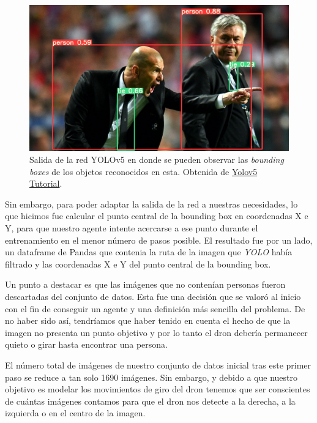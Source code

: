 \begin{figure}[ht!]
    \centering
    \includegraphics[width=1\linewidth]{figuras/yolov5_output_example.jpeg}
    \caption[Visualización de la salida de la red YOLO]{Salida de la red YOLOv5 en donde se pueden observar las \textit{bounding boxes} de los objetos reconocidos en esta. Obtenida de \href{https://colab.research.google.com/github/ultralytics/yolov5/blob/master/tutorial.ipynb}{Yolov5 Tutorial}.}
    \label{fig-yolov5-output-example}
\end{figure}

Sin embargo, para poder adaptar la salida de la red a nuestras necesidades, lo que hicimos fue calcular el punto central de la bounding box en coordenadas X e Y, para que nuestro agente intente acercarse a ese punto durante el entrenamiento en el menor número de pasos posible.
El resultado fue por un lado, un dataframe de Pandas que contenia la ruta de la imagen que \textit{YOLO} había filtrado y las coordenadas X e Y del punto central de la bounding box.
\medskip

Un punto a destacar es que las imágenes que no contenían personas fueron descartadas del conjunto de datos. Esta fue una decisión que se valoró al inicio con el fin de conseguir un agente y una definición más sencilla del problema. De no haber sido así, tendríamos que haber tenido en cuenta el hecho de que la imagen no presenta un punto objetivo y por lo tanto el dron debería permanecer quieto o girar hasta encontrar una persona.
\medskip

El número total de imágenes de nuestro conjunto de datos inicial tras este primer paso se reduce a tan solo 1690 imágenes. Sin embargo, y debido a que nuestro objetivo es modelar los movimientos de giro del dron tenemos que ser conscientes de cuántas imágenes contamos para que el dron nos detecte a la derecha, a la izquierda o en el centro de la imagen.
\medskip

